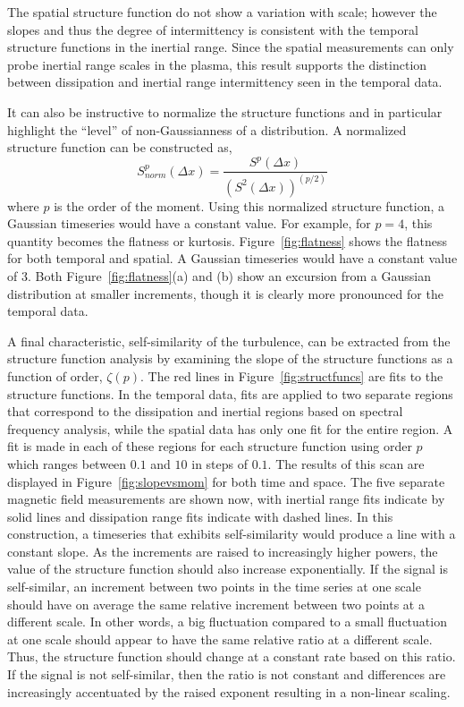 \documentclass[aps,prl,amsmath,amssymb,reprint,superscriptaddress]{revtex4-1} %
\begin{document}
The spatial structure function do not show a variation with scale; however the slopes and thus the degree of intermittency is consistent with the temporal structure functions in the inertial range. Since the spatial measurements can only probe inertial range scales in the plasma, this result supports the distinction between dissipation and inertial range intermittency seen in the temporal data.

It can also be instructive to normalize the structure functions and in particular highlight the ``level'' of non-Gaussianness of a distribution. A normalized structure function can be constructed as,
\begin{equation}
S_{norm}^{p}(\Delta x) = \frac{S^{p}(\Delta x)}{(S^2(\Delta x))^{(p/2)}}
\label{eq:normstructfunc}
\end{equation}
where $p$ is the order of the moment. Using this normalized structure function, a Gaussian timeseries would have a constant value. For example, for $p=4$, this quantity becomes the flatness or kurtosis. Figure~\ref{fig:flatness} shows the flatness for both temporal and spatial. A Gaussian timeseries would have a constant value of 3. Both Figure~\ref{fig:flatness}(a) and (b) show an excursion from a Gaussian distribution at smaller increments, though it is clearly more pronounced for the temporal data.

A final characteristic, self-similarity of the turbulence, can be extracted from the structure function analysis by examining the slope of the structure functions as a function of order, $\zeta(p)$. The red lines in Figure~\ref{fig:structfuncs} are fits to the structure functions. In the temporal data, fits are applied to two separate regions that correspond to the dissipation and inertial regions based on spectral frequency analysis, while the spatial data has only one fit for the entire region. A fit is made in each of these regions for each structure function using order $p$ which ranges between $0.1$ and $10$ in steps of $0.1$. The results of this scan are displayed in Figure~\ref{fig:slopevsmom} for both time and space. The five separate magnetic field measurements are shown now, with inertial range fits indicate by solid lines and dissipation range fits indicate with dashed lines. In this construction, a timeseries that exhibits self-similarity would produce a line with a constant slope. As the increments are raised to increasingly higher powers, the value of the structure function should also increase exponentially. If the signal is self-similar, an increment between two points in the time series at one scale should have on average the same relative increment between two points at a different scale. In other words, a big fluctuation compared to a small fluctuation at one scale should appear to have the same relative ratio at a different scale. Thus, the structure function should change at a constant rate based on this ratio. If the signal is not self-similar, then the ratio is not constant and differences are increasingly accentuated by the raised exponent resulting in a non-linear scaling.
\end{document}
